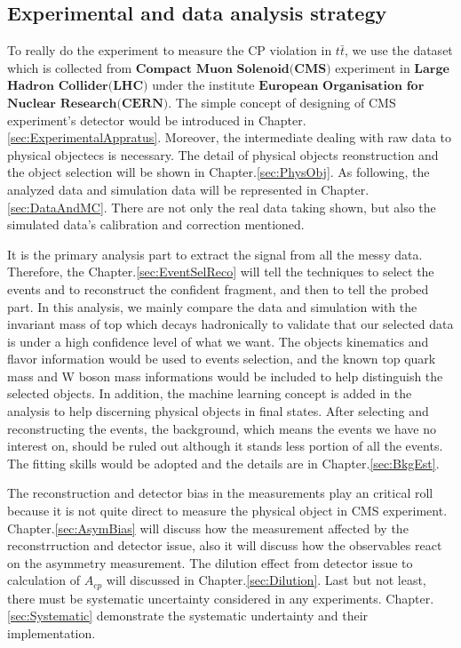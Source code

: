	\subsection{Experimental and data analysis strategy}
	\label{ssec:Intro_ExpDAStr}

		To really do the experiment to measure the CP violation in $t\bar{t}$, we use the dataset which is collected from $\textbf{Compact Muon Solenoid(CMS)}$ experiment in $\textbf{Large}$ $\textbf{Hadron}$ $\textbf{Collider(LHC)}$ under the institute $\textbf{European}$ $\textbf{Organisation}$ $\textbf{for}$ $\textbf{Nuclear}$ $\textbf{Research}$$\textbf{(CERN)}$. The simple concept of designing of CMS experiment's detector would be introduced in Chapter.\ref{sec:ExperimentalAppratus}. Moreover, the intermediate dealing with raw data to physical objectecs is necessary. The detail of physical objects reonstruction and the object selection will be shown in Chapter.\ref{sec:PhysObj}. As following, the analyzed data and simulation data will be represented in Chapter.\ref{sec:DataAndMC}. There are not only the real data taking shown, but also the simulated data's calibration and correction mentioned.

		It is the primary analysis part to extract the signal from all the messy data. Therefore, the Chapter.\ref{sec:EventSelReco} will tell the techniques to select the events and to reconstruct the confident fragment, and then to tell the probed part. In this analysis, we mainly compare the data and simulation with the invariant mass of top which decays hadronically to validate that our selected data is under a high confidence level of what we want. The objects kinematics and flavor information would be used to events selection, and the known top quark mass and W boson mass informations would be included to help distinguish the selected objects. In addition, the machine learning concept is added in the analysis to help discerning physical objects in final states. After selecting and reconstructing the events, the background, which means the events we have no interest on, should be ruled out although it stands less portion of all the events. The fitting skills would be adopted and the details are in Chapter.\ref{sec:BkgEst}. 

		The reconstruction and detector bias in the measurements play an critical roll because it is not quite direct to measure the physical object in CMS experiment. Chapter.\ref{sec:AsymBias} will discuss how the measurement affected by the reconstrruction and detector issue, also it will discuss how the observables react on the asymmetry measurement. The dilution effect from detector issue to calculation of $A_{cp}$ will discussed in Chapter.\ref{sec:Dilution}. Last but not least, there must be systematic uncertainty considered in any experiments. Chapter.\ref{sec:Systematic} demonstrate the systematic undertainty and their implementation.


